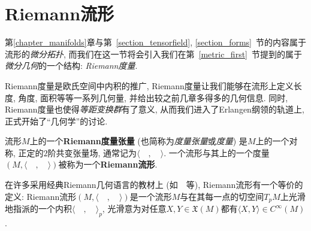 \section{Riemann流形}
第\ref{chapter_manifolds}章与第~\ref{section_tensorfield}, \ref{section_forms}~节的内容属于流形的\textit{微分拓扑}, 而我们在这一节将会引入我们在第~\ref{metric_first}~节提到的属于\textit{微分几何}的一个结构: \textit{Riemann度量}.

Riemann度量是欧氏空间中内积的推广, Riemann度量让我们能够在流形上定义长度, 角度, 面积等等一系列几何量, 并给出较之前几章多得多的几何信息.
同时, Riemann度量也使得\textit{等距变换群}有了意义, 从而我们进入了Erlangen纲领的轨道上, 正式开始了``几何学''的讨论.

\begin{defn}
    流形$M$上的一个\textbf{Riemann度量张量} (也简称为\textit{度量张量}或\textit{度量}) 是$M$上的一个对称, 正定的$2$阶共变张量场, 通常记为$\langle\quad,\quad\rangle$.
    一个流形与其上的一个度量$(M,\langle\quad,\quad\rangle)$被称为一个\textbf{Riemann流形}.
\end{defn}

\begin{rem}
    在许多采用经典Riemann几何语言的教材上 (如~\parencites{doCarmo_DiffForm}{Tu_DiffGeo}~等), Riemann流形有一个等价的定义:
    Riemann流形$(M,\langle\quad,\quad\rangle)$是一个流形$M$与在其每一点的切空间$T_pM$上光滑地指派的一个内积$\langle\quad,\quad\rangle_p$, 光滑意为对任意$X,Y\in\mathfrak{X}(M)$都有$\langle X,Y\rangle\in C^\infty(M)$.
\end{rem}